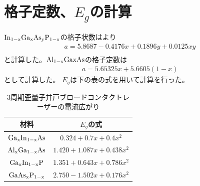 \clearpage
\section{格子定数、$E_{g}$の計算}
$\rm{In_{1-x}Ga_{x}As_{y}P_{1-x}}$の格子状数は\cite{ref_iga}より
\begin{eqnarray}
a=5.8687-0.4176x+0.1896y+0.0125xy\\
\end{eqnarray}
と計算した。$\rm{Al_{1-x}Ga{x}As}$の格子定数は
\begin{eqnarray}
a=5.65325x+5.6605(1-x)
\end{eqnarray}
として計算した。
$E_{g}$は下の表の式を用いて計算を行った。
\begin{table}[h]
  \caption{3周期歪量子井戸ブロードコンタクトレーザーの電流広がり}
  \label{table:table_Eg}
  \centering
  \begin{tabular}{cc}
    \hline
    材料& $E_{g}$の式   \\
    \hline \hline
     $\rm{Ga_{x}In_{1-x}As}$ &$0.324+0.7x+0.4x^2$   \\
    $\rm{Al_{x}Ga_{1-x}As}$& $1.420+1.087x+0.438x^2$ \\
    $\rm{Ga_{x}In_{1-x}P}$& $1.351+0.643x+0.786x^2$ \\ 
    $\rm{GaAs_{x}P_{1-x}}$&$2.750-1.502x+0.176x^2$\\
    \hline
  \end{tabular}
\end{table}

